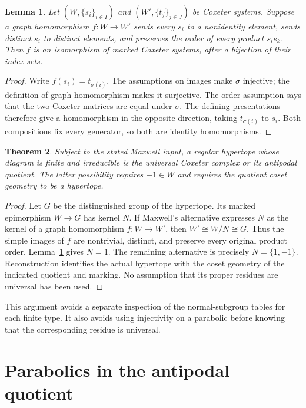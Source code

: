 \documentclass[11pt,a4paper]{article}
\newtheorem{theorem}{Theorem}
\newtheorem{lemma}[theorem]{Lemma}
\begin{document}
\begin{lemma}\label{rigidity}
Let $(W,\{s_i\}_{i\in I})$ and $(W',\{t_j\}_{j\in J})$ be Coxeter systems.
Suppose a graph homomorphism $f:W\to W'$ sends every $s_i$ to a nonidentity
element, sends distinct $s_i$ to distinct elements, and preserves the order
of every product $s_i s_k$. Then $f$ is an isomorphism of marked Coxeter
systems, after a bijection of their index sets.
\end{lemma}
\begin{proof}
Write $f(s_i)=t_{\sigma(i)}$. The assumptions on images make $\sigma$
injective; the definition of graph homomorphism makes it surjective.
The order assumption says that the two Coxeter matrices are equal under
$\sigma$. The defining presentations therefore give a homomorphism in the
opposite direction, taking $t_{\sigma(i)}$ to $s_i$. Both compositions fix
every generator, so both are identity homomorphisms.
\end{proof}

\begin{theorem}\label{two}
Subject to the stated Maxwell input, a regular hypertope whose diagram is
finite and irreducible is the universal Coxeter complex or its antipodal
quotient. The latter possibility requires $-1\in W$ and requires the quotient
coset geometry to be a hypertope.
\end{theorem}
\begin{proof}
Let $G$ be the distinguished group of the hypertope. Its marked epimorphism
$W\to G$ has kernel $N$. If Maxwell's alternative expresses $N$ as the
kernel of a graph homomorphism $f:W\to W'$, then $W'\cong W/N\cong G$.
Thus the simple images of $f$ are nontrivial, distinct, and preserve every
original product order. Lemma~\ref{rigidity} gives $N=1$. The remaining
alternative is precisely $N=\{1,-1\}$. Reconstruction identifies the actual
hypertope with the coset geometry of the indicated quotient and marking.
No assumption that its proper residues are universal has been used.
\end{proof}

This argument avoids a separate inspection of the normal-subgroup tables
for each finite type. It also avoids using injectivity on a parabolic before
knowing that the corresponding residue is universal.

\section{Parabolics in the antipodal quotient}
\end{document}
